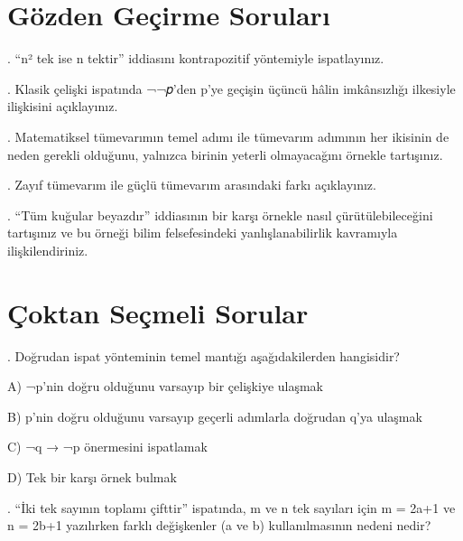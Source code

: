 \section*{Gözden Geçirme Soruları}

\par{}. “n² tek ise n tektir” iddiasını kontrapozitif yöntemiyle ispatlayınız.

\par{}. Klasik çelişki ispatında ¬¬𝑝’den p’ye geçişin üçüncü hâlin imkânsızlığı ilkesiyle ilişkisini açıklayınız.

\par{}. Matematiksel tümevarımın temel adımı ile tümevarım adımının her ikisinin de neden gerekli olduğunu, yalnızca birinin yeterli olmayacağını örnekle tartışınız.

\par{}. Zayıf tümevarım ile güçlü tümevarım arasındaki farkı açıklayınız.

\par{}. “Tüm kuğular beyazdır” iddiasının bir karşı örnekle nasıl çürütülebileceğini tartışınız ve bu örneği bilim felsefesindeki yanlışlanabilirlik kavramıyla ilişkilendiriniz.

\section*{Çoktan Seçmeli Sorular}

\par\smallskip{}. Doğrudan ispat yönteminin temel mantığı aşağıdakilerden hangisidir?

\par\noindent\hspace*{1.6em}A) ¬p’nin doğru olduğunu varsayıp bir çelişkiye ulaşmak

\par\noindent\hspace*{1.6em}B) p’nin doğru olduğunu varsayıp geçerli adımlarla doğrudan q’ya ulaşmak

\par\noindent\hspace*{1.6em}C) ¬q → ¬p önermesini ispatlamak

\par\noindent\hspace*{1.6em}D) Tek bir karşı örnek bulmak

\par\smallskip{}. “İki tek sayının toplamı çifttir” ispatında, m ve n tek sayıları için m = 2a+1 ve n = 2b+1 yazılırken farklı değişkenler (a ve b) kullanılmasının nedeni nedir?

